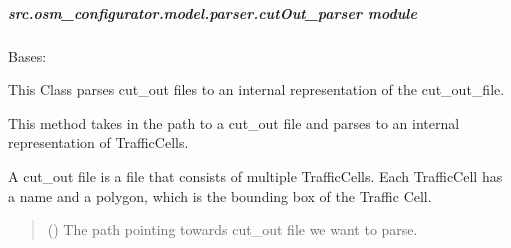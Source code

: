 \documentclass[letterpaper,10pt,english]{sphinxmanual}
\begin{document}
\subparagraph{src.osm\_configurator.model.parser.cutOut\_parser module}
\label{\detokenize{apidoc/src.osm_configurator.model.parser:module-src.osm_configurator.model.parser.cutOut_parser}}\label{\detokenize{apidoc/src.osm_configurator.model.parser:src-osm-configurator-model-parser-cutout-parser-module}}

\begin{fulllineitems}
\label{\detokenize{apidoc/src.osm_configurator.model.parser:src.osm_configurator.model.parser.cutOut_parser.CutOutParser}}
\pysigstartsignatures
{}
\pysigstopsignatures
\sphinxAtStartPar
Bases: {\hyperref[\detokenize{apidoc/src.osm_configurator.model.parser:src.osm_configurator.model.parser.cutOut_parser_interface.CutOutParserInterface}]{}}

\sphinxAtStartPar
This Class parses cut\_out files to an internal representation of the cut\_out\_file.

\begin{fulllineitems}
\label{\detokenize{apidoc/src.osm_configurator.model.parser:src.osm_configurator.model.parser.cutOut_parser.CutOutParser.parse_cutout_file}}
\pysigstartsignatures
{}
\pysigstopsignatures
\sphinxAtStartPar
This method takes in the path to a cut\_out file and parses to an
internal representation of TrafficCells.

\sphinxAtStartPar
A cut\_out file is a  file that consists of multiple TrafficCells. Each TrafficCell has
a name and a polygon, which is the bounding box of the Traffic Cell.
\begin{quote}\begin{description}
\sphinxAtStartPar
{} () \textendash{} The path pointing towards cut\_out file we want to parse.


\end{description}
\end{quote}
\end{fulllineitems}
\end{fulllineitems}
\end{document}
